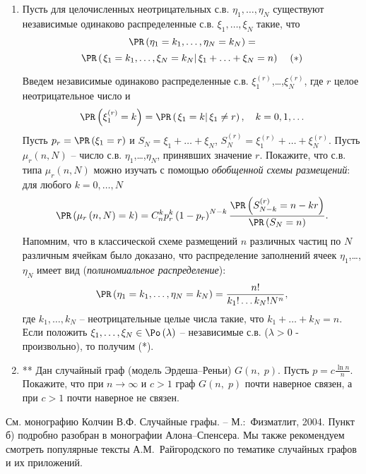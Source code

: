  
\begin{problem}
\noindent
\begin{enumerate}
\item  Пусть для целочисленных  неотрицательных с.в. $\eta _1,\ldots,\eta _N$ существуют независимые одинаково распределенные с.в. 
$\xi_1,\ldots,\xi_N$ такие, что
\[ 
\PR\left( {\eta _1 =k_1,\ldots,\eta _N =k_N } \right) =  \]\[ \PR\left( {\left. {\xi _1 
=k_1 ,\ldots,\xi _N =k_N } \right|\xi _1 +\ldots+\xi _N =n} \right) \;\;\;\; (*) \]
 
Введем независимые одинаково распределенные с.в. $\xi _1^{\left( r \right)} 
$,{\ldots},$\xi _N^{\left( r \right)} $, где $r$ целое неотрицательное число 
и
\[
\PR\left( {\xi _1^{\left( r \right)} =k} \right)=\PR\left( {\left. {\xi _1 =k} 
\right|\xi _1 \ne r} \right),
\quad
k=0,1,\ldots
\]
Пусть $p_r = \PR\left( {\xi _1 =r} \right)$ и $S_N =\xi _1 +\ldots+\xi _N$,
$S_N^{\left( r \right)} =\xi _1^{\left( r \right)} +\ldots+\xi _N^{\left( r \right)} $. Пусть $\mu _r \left( {n,N} \right)$ -- число с.в. $\eta _1$,{\ldots},$\eta_N $, принявших значение $r$. Покажите, что с.в. типа $\mu_r \left( {n,N} \right)$ можно изучать с помощью \textit{обобщенной схемы размещений}: для любого $k=0,\ldots,N$
\[
\PR\left( {\mu _r \left( {n,N} \right)=k} \right)=C_n^k p_r^k \left( {1-p_r } 
\right)^{N-k}\frac{\PR\left( {S_{N-k}^{\left( r \right)} =n-kr} 
\right)}{\PR\left( {S_N =n} \right)}.
\]
Напомним, что в классической схеме размещений $n$ различных частиц по $N$ 
различным ячейкам было доказано, что распределение заполнений ячеек $\eta _1 
$,{\ldots},$\eta _N $ имеет вид (\textit{полиномиальное распределение}):
\[
\PR\left( {\eta _1 =k_1 ,\ldots,\eta _N =k_N } \right)=\frac{n!}{k_1!\ldots k_N! N^n},
\]
где $k_1,\ldots,k_N$ -- неотрицательные целые числа такие, что  $k_1 +\ldots+k_N =n$. Если положить $\xi_1,\ldots,\xi_N \in \Po \left( \lambda 
\right)$ -- независимые с.в. ($\lambda >0$ - произвольно), то получим (*).
 
\item ** Дан случайный граф (модель Эрдеша--Реньи) $G\left( {n,\;p} \right)$. Пусть 
$p=c\frac{\ln n}{n}$. Покажите, что при $n\to\infty$ и $c>1$ граф $G\left( {n,\;p} \right)$ 
почти наверное связен, а при $c>1$ почти наверное не связен.
 
 
\end{enumerate}
\begin{remark}
См. монографию Колчин В.Ф. Случайные графы. -- М.:~Физматлит, 2004. Пункт б) подробно разобран в монографии Алона--Спенсера. Мы также рекомендуем смотреть популярные тексты А.М.~Райгородского по тематике случайных графов и их приложений.
\end{remark}
\end{problem}


